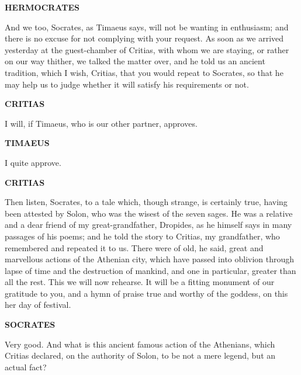 \documentclass[11pt,letter]{article}
\begin{document}
\par \textbf{HERMOCRATES}
\par   And we too, Socrates, as Timaeus says, will not be wanting in enthusiasm; and there is no excuse for not complying with your request. As soon as we arrived yesterday at the guest-chamber of Critias, with whom we are staying, or rather on our way thither, we talked the matter over, and he told us an ancient tradition, which I wish, Critias, that you would repeat to Socrates, so that he may help us to judge whether it will satisfy his requirements or not.

\par \textbf{CRITIAS}
\par   I will, if Timaeus, who is our other partner, approves.

\par \textbf{TIMAEUS}
\par   I quite approve.

\par \textbf{CRITIAS}
\par   Then listen, Socrates, to a tale which, though strange, is certainly true, having been attested by Solon, who was the wisest of the seven sages. He was a relative and a dear friend of my great-grandfather, Dropides, as he himself says in many passages of his poems; and he told the story to Critias, my grandfather, who remembered and repeated it to us. There were of old, he said, great and marvellous actions of the Athenian city, which have passed into oblivion through lapse of time and the destruction of mankind, and one in particular, greater than all the rest. This we will now rehearse. It will be a fitting monument of our gratitude to you, and a hymn of praise true and worthy of the goddess, on this her day of festival.

\par \textbf{SOCRATES}
\par   Very good. And what is this ancient famous action of the Athenians, which Critias declared, on the authority of Solon, to be not a mere legend, but an actual fact?
\end{document}
